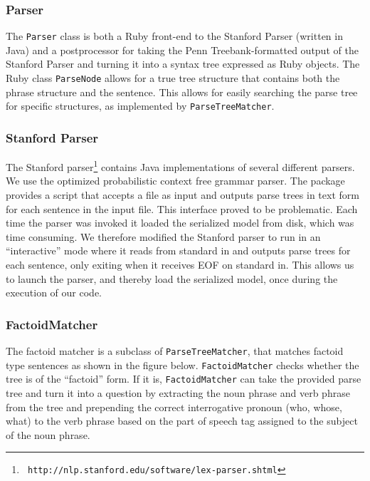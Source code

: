 \documentclass[11pt]{article}
\begin{document}
\subsubsection{Parser}

The \texttt{Parser} class is both a Ruby front-end to the Stanford Parser
(written in Java) and a postprocessor for taking the Penn Treebank-formatted
output of the Stanford Parser and turning it into a syntax tree expressed as
Ruby objects. The Ruby class \texttt{ParseNode} allows for a true tree structure
that contains both the phrase structure and the sentence. This allows for easily
searching the parse tree for specific structures, as implemented by
\texttt{ParseTreeMatcher}.

\subsubsection{Stanford Parser}

The Stanford parser\footnote{\tt
http://nlp.stanford.edu/software/lex-parser.shtml} contains Java implementations
of several different parsers. We use the optimized probabilistic context free
grammar parser. The package provides a script that accepts a file as input and
outputs parse trees in text form for each sentence in the input file. This
interface proved to be problematic. Each time the parser was invoked it loaded
the serialized model from disk, which was time consuming. We therefore modified
the Stanford parser to run in an ``interactive'' mode where it reads from
standard in and outputs parse trees for each sentence, only exiting when it
receives EOF on standard in. This allows us to launch the parser, and thereby
load the serialized model, once during the execution of our code.

\subsubsection{FactoidMatcher}

The factoid matcher is a subclass of \texttt{ParseTreeMatcher}, that matches
factoid type sentences as shown in the figure below. \texttt{FactoidMatcher}
checks whether the tree is of the ``factoid'' form. If it is,
\texttt{FactoidMatcher} can take the provided parse tree and turn it into a
question by extracting the noun phrase and verb phrase from the tree and
prepending the correct interrogative pronoun (who, whose, what) to the verb
phrase based on the part of speech tag assigned to the subject of the noun
phrase.
\end{document}
